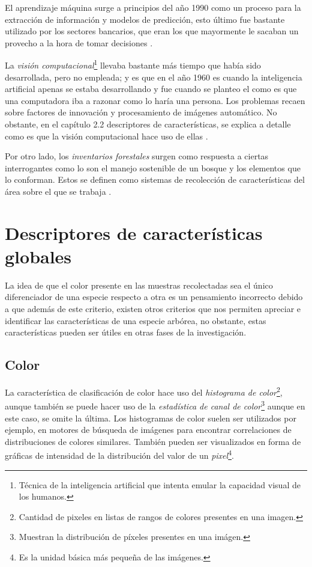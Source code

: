 El aprendizaje máquina surge a principios del año 1990 como un proceso para la extracción de información y modelos de predicción, esto último fue bastante utilizado por los sectores bancarios, que eran los que mayormente le sacaban un provecho a la hora de tomar decisiones \citep{rf5}. 

La \emph{visión computacional}\footnote{Técnica de la inteligencia artificial que intenta emular la capacidad visual de los humanos.} llevaba bastante más tiempo que había sido desarrollada, pero no empleada; y es que en el año 1960 es cuando la inteligencia artificial apenas se estaba desarrollando y fue cuando se planteo el como es que una computadora iba a razonar como lo haría una persona. Los problemas recaen sobre factores de innovación y procesamiento de imágenes automático. No obstante, en el capítulo 2.2 descriptores de características, se explica a detalle como es que la visión computacional hace uso de ellas \citep{rf6}.

Por otro lado, los \emph{inventarios forestales} surgen como respuesta a ciertas interrogantes como lo son el manejo sostenible de un bosque y los elementos que lo conforman. Estos se definen como sistemas de recolección de características del área sobre el que se trabaja \citep{rf7}.

\section{Descriptores de características globales}
La idea de que el color presente en las muestras recolectadas sea el único diferenciador de una especie respecto a otra es un pensamiento incorrecto debido a que además de este criterio, existen otros criterios que nos permiten apreciar e identificar las características de una especie arbórea, no obstante, estas características pueden ser útiles en otras fases de la investigación. 

\subsection{Color}
La característica de clasificación de color hace uso del \emph{histograma de color}\footnote{Cantidad de pixeles en listas de rangos de colores presentes en una imagen.}, aunque también se puede hacer uso de la \emph{estadística de canal de color}\footnote{Muestran la distribución de píxeles presentes en una imágen.} aunque en este caso, se omite la última. Los histogramas de color suelen ser utilizados por ejemplo, en motores de búsqueda de imágenes para encontrar correlaciones de distribuciones de colores similares. También pueden ser visualizados en forma de gráficas de intensidad de la distribución del valor de un \emph{pixel}\footnote{Es la unidad básica más pequeña de las imágenes.}.

